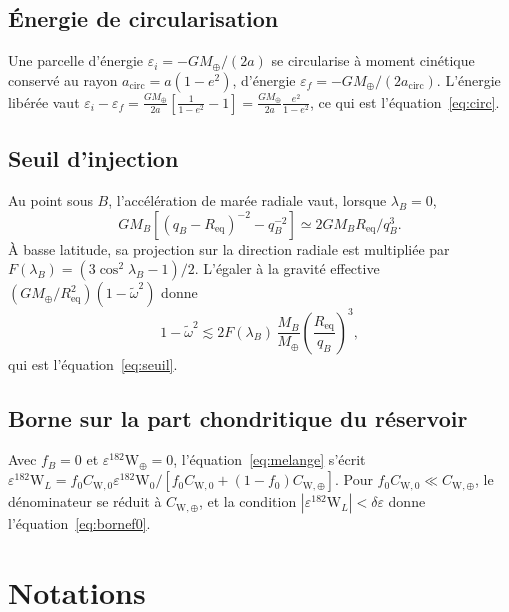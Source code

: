 \documentclass[11pt,a4paper,openany]{report}
\newcommand{\Mt}{M_{\oplus}}
\newcommand{\Req}{R_{\mathrm{eq}}}
\begin{document}
\section{Énergie de circularisation}

Une parcelle d'énergie $\varepsilon_i=-G\Mt/(2a)$ se circularise à moment cinétique conservé au
rayon $a_{\mathrm{circ}}=a(1-e^2)$, d'énergie $\varepsilon_f=-G\Mt/(2a_{\mathrm{circ}})$. L'énergie
libérée vaut
$\varepsilon_i-\varepsilon_f=\frac{G\Mt}{2a}\left[\frac{1}{1-e^2}-1\right]=\frac{G\Mt}{2a}\frac{e^2}{1-e^2}$,
ce qui est l'équation~\eqref{eq:circ}.

\section{Seuil d'injection}

Au point sous $B$, l'accélération de marée radiale vaut, lorsque $\lambda_B=0$,
\begin{equation}
GM_B\left[(q_B-\Req)^{-2}-q_B^{-2}\right]\simeq2GM_B\Req/q_B^3.
\end{equation}
À basse latitude, sa projection sur la direction radiale est multipliée par
$F(\lambda_B)=(3\cos^2\lambda_B-1)/2$. L'égaler à la gravité effective
$(G\Mt/\Req^2)(1-\tilde\omega^2)$ donne
\begin{equation}
1-\tilde\omega^2\lesssim2F(\lambda_B)\,\frac{M_B}{\Mt}\left(\frac{\Req}{q_B}\right)^3,
\end{equation}
qui est l'équation~\eqref{eq:seuil}.

\section{Borne sur la part chondritique du réservoir}
\label{app:borneW}

Avec $f_B=0$ et $\varepsilon^{182}\mathrm{W}_\oplus=0$, l'équation~\eqref{eq:melange} s'écrit
$\varepsilon^{182}\mathrm{W}_L=f_0C_{\mathrm{W},0}\varepsilon^{182}\mathrm{W}_0/
[f_0C_{\mathrm{W},0}+(1-f_0)C_{\mathrm{W},\oplus}]$. Pour $f_0C_{\mathrm{W},0}\ll C_{\mathrm{W},\oplus}$,
le dénominateur se réduit à $C_{\mathrm{W},\oplus}$, et la condition
$|\varepsilon^{182}\mathrm{W}_L|<\delta\varepsilon$ donne l'équation~\eqref{eq:bornef0}.

\chapter{Notations}
\label{app:notations}
\end{document}
